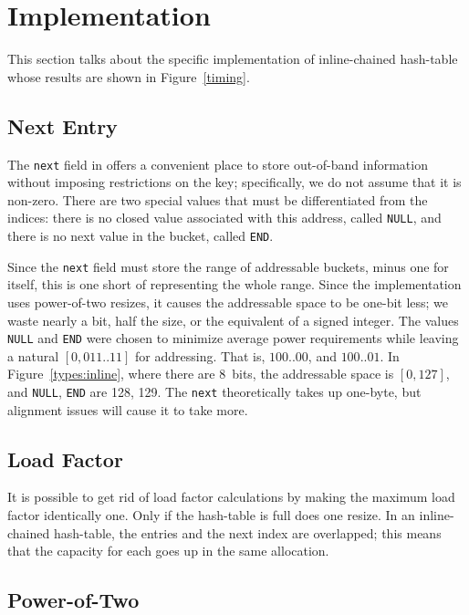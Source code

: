 \documentclass[12pt]{article}
\newcommand{\code}[1]{\colorbox{light-gray}{\texttt{#1}}}
\begin{document}
\section{Implementation}

This section talks about the specific implementation of inline-chained hash-table whose results are shown in Figure~\ref{timing}.

\subsection{Next Entry}

The \code{next} field in offers a convenient place to store out-of-band information without imposing restrictions on the key; specifically, we do not assume that it is non-zero. There are two special values that must be differentiated from the indices: there is no closed value associated with this address, called \code{NULL}, and there is no next value in the bucket, called \code{END}.

Since the \code{next} field must store the range of addressable buckets, minus one for itself, this is one short of representing the whole range. Since the implementation uses power-of-two resizes, it causes the addressable space to be one-bit less; we waste nearly a bit, half the size, or the equivalent of a signed integer. The values \code{NULL} and \code{END} were chosen to minimize average power requirements while leaving a natural $[0, 011..11]$ for addressing. That is, $100..00$, and $100..01$. In Figure~\ref{types:inline}, where there are 8~bits, the addressable space is $[0, 127]$, and \code{NULL}, \code{END} are 128, 129. The \code{next} theoretically takes up one-byte, but alignment issues will cause it to take more.

\subsection{Load Factor}

It is possible to get rid of load factor calculations by making the maximum load factor identically one. Only if the hash-table is full does one resize. In an inline-chained hash-table, the entries and the next index are overlapped; this means that the capacity for each goes up in the same allocation.

\subsection{Power-of-Two}
\end{document}
